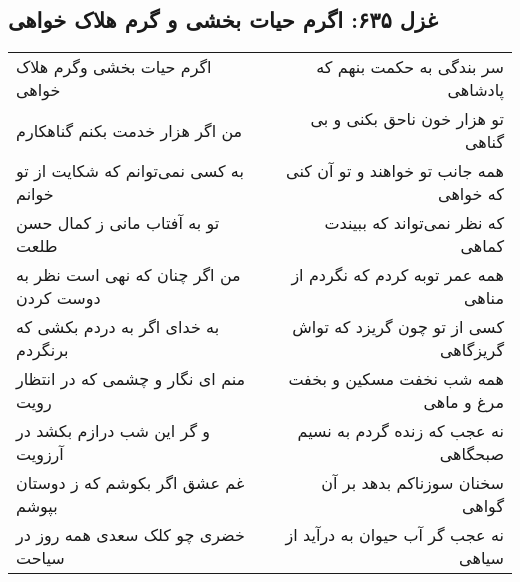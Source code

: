 \begin{center}
\section*{غزل ۶۳۵: اگرم حیات بخشی و گرم هلاک خواهی}
\label{sec:635}
\begin{longtable}{l p{0.5cm} r}
اگرم حیات بخشی وگرم هلاک خواهی
&&
سر بندگی به حکمت بنهم که پادشاهی
\\
من اگر هزار خدمت بکنم گناهکارم
&&
تو هزار خون ناحق بکنی و بی گناهی
\\
به کسی نمی‌توانم که شکایت از تو خوانم
&&
همه جانب تو خواهند و تو آن کنی که خواهی
\\
تو به آفتاب مانی ز کمال حسن طلعت
&&
که نظر نمی‌تواند که ببیندت کماهی
\\
من اگر چنان که نهی است نظر به دوست کردن
&&
همه عمر توبه کردم که نگردم از مناهی
\\
به خدای اگر به دردم بکشی که برنگردم
&&
کسی از تو چون گریزد که تواش گریزگاهی
\\
منم ای نگار و چشمی که در انتظار رویت
&&
همه شب نخفت مسکین و بخفت مرغ و ماهی
\\
و گر این شب درازم بکشد در آرزویت
&&
نه عجب که زنده گردم به نسیم صبحگاهی
\\
غم عشق اگر بکوشم که ز دوستان بپوشم
&&
سخنان سوزناکم بدهد بر آن گواهی
\\
خضری چو کلک سعدی همه روز در سیاحت
&&
نه عجب گر آب حیوان به درآید از سیاهی
\\
\end{longtable}
\end{center}
